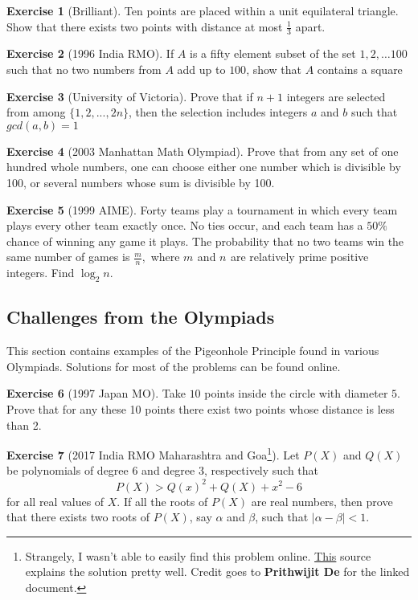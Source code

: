 \documentclass[l1pt]{article}
\theoremstyle{plain}
\theoremstyle{definition}
\newtheorem{exercise}{Exercise}[section]
\theoremstyle{remark}
\begin{document}
\begin{exercise}[Brilliant]
Ten points are placed within a unit equilateral triangle. Show that there exists two points with distance at most $\frac{1}{3}$ apart.
\end{exercise}

\begin{exercise}[1996 India RMO]
 If $A$ is a fifty element subset of the set $1,2,\ldots 100$ such that no two numbers from $A$ add up to $100$, show that $A$ contains a square
\end{exercise}

\begin{exercise}[University of Victoria]
 Prove that if $n + 1$ integers are selected from among $\{1, 2,..., 2n\}$, then the selection includes integers $a$ and $b$ such that $gcd(a,b)=1$
\end{exercise}

\begin{exercise}[2003 Manhattan Math Olympiad]
 Prove that from any set of one hundred whole numbers, one can choose either one number which is divisible by 100, or several numbers whose sum is divisible by 100.
\end{exercise}

\begin{exercise}[1999 AIME]
 Forty teams play a tournament in which every team plays every other team exactly once. No ties occur, and each team has a $50 \%$ chance of winning any game it plays. The probability that no two teams win the same number of games is $\frac mn,$ where $m_{}$ and $n_{}$ are relatively prime positive integers. Find $\log_2 n.$
\end{exercise}

\subsection{Challenges from the Olympiads}

This section contains examples of the Pigeonhole Principle found in various Olympiads. Solutions for most of the problems can be found online.

\begin{exercise}[1997 Japan MO]
 Take $10$ points inside the circle with diameter $5$. Prove that for any these 10 points there exist two points whose distance is less than 2.
\end{exercise}

\begin{exercise}[2017 India RMO Maharashtra and Goa\footnote{Strangely, I wasn't able to easily find this problem online. \href{https://apfstatic.s3.ap-south-1.amazonaws.com/s3fs-public/15_Prithwijit_PigeonholePrinciple.pdf?FIhlG8dGoKVAa36UwezGHRRxuVBzLIZ0}{This} source explains the solution pretty well. Credit goes to \textbf{Prithwijit De} for the linked document.}]
 Let $P(X)$ and $Q(X)$ be polynomials of degree 6 and degree 3, respectively such that \[P(X)>Q(x)^2+Q(X)+x^2-6\] for all real values of $X$. If all the roots of $P(X)$ are real numbers, then prove that there exists two roots of $P(X)$, say $\alpha$ and $\beta$, such that $|\alpha-\beta|<1$.
\end{exercise}
\end{document}
